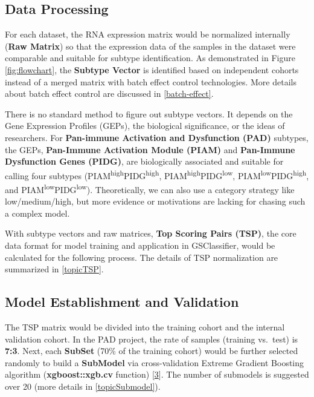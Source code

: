 \documentclass[
  12pt,
]{book}
\begin{document}
\hypertarget{data-processing}{%
\subsection{Data Processing}\label{data-processing}}

For each dataset, the RNA expression matrix would be normalized internally (\textbf{Raw Matrix}) so that the expression data of the samples in the dataset were comparable and suitable for subtype identification. As demonstrated in Figure \ref{fig:flowchart}, the \textbf{Subtype Vector} is identified based on independent cohorts instead of a merged matrix with batch effect control technologies. More details about batch effect control are discussed in \ref{batch-effect}.

There is no standard method to figure out subtype vectors. It depends on the Gene Expression Profiles (GEPs), the biological significance, or the ideas of researchers. For \textbf{Pan-immune Activation and Dysfunction (PAD)} subtypes, the GEPs, \textbf{Pan-Immune Activation Module (PIAM)} and \textbf{Pan-Immune Dysfunction Genes (PIDG)}, are biologically associated and suitable for calling four subtypes (PIAM\textsuperscript{high}PIDG\textsuperscript{high}, PIAM\textsuperscript{high}PIDG\textsuperscript{low}, PIAM\textsuperscript{low}PIDG\textsuperscript{high}, and PIAM\textsuperscript{low}PIDG\textsuperscript{low}). Theoretically, we can also use a category strategy like low/medium/high, but more evidence or motivations are lacking for chasing such a complex model.

With subtype vectors and raw matrices, \textbf{Top Scoring Pairs (TSP)}, the core data format for model training and application in GSClassifier, would be calculated for the following process. The details of TSP normalization are summarized in \ref{topicTSP}.

\hypertarget{model-establishment-and-validation}{%
\subsection{Model Establishment and Validation}\label{model-establishment-and-validation}}

The TSP matrix would be divided into the training cohort and the internal validation cohort. In the PAD project, the rate of samples (training vs.~test) is \textbf{7:3}. Next, each \textbf{SubSet} (70\% of the training cohort) would be further selected randomly to build a \textbf{SubModel} via cross-validation Extreme Gradient Boosting algorithm (\textbf{xgboost::xgb.cv} function) {[}\protect\hyperlink{ref-RN345}{3}{]}. The number of submodels is suggested over 20 (more details in \ref{topicSubmodel}).
\end{document}
